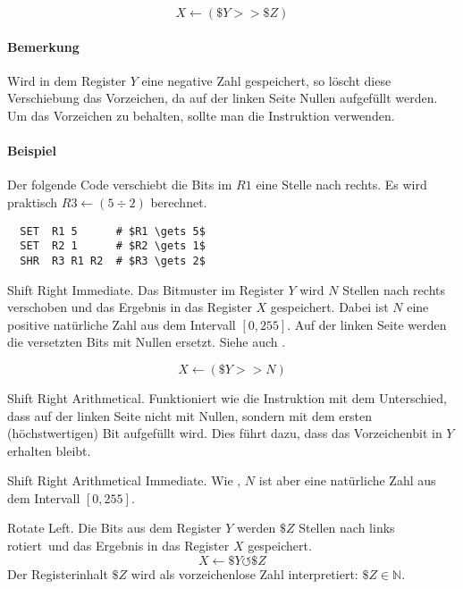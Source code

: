 \[
    X \gets (\$Y >> \$Z)
\]



\paragraph{Bemerkung}
Wird in dem Register $Y$ eine negative Zahl gespeichert, so löscht diese
Verschiebung das Vorzeichen, da auf der linken Seite Nullen aufgefüllt werden.
Um das Vorzeichen zu behalten, sollte man die Instruktion 
verwenden.

\paragraph{Beispiel}
Der folgende Code verschiebt die Bits im $R1$ eine Stelle nach rechts.
Es wird praktisch $R3 \gets (5 \div 2)$ berechnet.
\begin{lstlisting}
  SET  R1 5      # $R1 \gets 5$
  SET  R2 1      # $R2 \gets 1$
  SHR  R3 R1 R2  # $R3 \gets 2$
\end{lstlisting}


\glqq Shift Right Immediate\grqq.
Das Bitmuster im Register $Y$ wird $N$ Stellen nach rechts verschoben und das
Ergebnis in das Register $X$ gespeichert.
Dabei ist $N$ eine positive natürliche Zahl aus dem Intervall $[0, 255]$.
Auf der linken Seite werden die versetzten Bits mit Nullen ersetzt.
Siehe auch .

\[
    X \gets (\$Y >> N)
\]

\glqq Shift Right Arithmetical\grqq.
Funktioniert wie die Instruktion  mit dem Unterschied, dass auf der
linken Seite nicht mit Nullen, sondern mit dem ersten (höchstwertigen) Bit
aufgefüllt wird. Dies führt dazu, dass das Vorzeichenbit in $Y$ erhalten
bleibt.


\glqq Shift Right Arithmetical Immediate\grqq.
Wie , $N$ ist aber eine natürliche Zahl aus dem Intervall
$[0, 255]$.



\glqq Rotate Left\grqq. Die Bits aus dem Register $Y$ werden $\$Z$ Stellen nach
links \glqq rotiert\grqq\ und das Ergebnis in das Register $X$ gespeichert.
\[
    X \gets \$Y \circlearrowleft \$Z
\]
Der Registerinhalt $\$Z$ wird als vorzeichenlose Zahl interpretiert: 
$\$Z \in \mathds{N}$.

